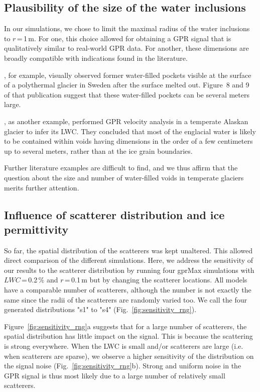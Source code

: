 \subsection{Plausibility of the size of the water inclusions}

In our simulations, we chose to limit the maximal radius of the water inclusions to $r$\,=\,1\,m. For one, this choice allowed for obtaining a GPR signal that is qualitatively similar to real-world GPR data. For another, these dimensions are broadly compatible with indications found in the literature.

\cite{Holmlund1988}, for example, visually observed former water-filled pockets visible at the surface of a polythermal glacier in Sweden after the surface melted out. Figure~8 and 9 of that publication suggest that these water-filled pockets can be several meters large.

\cite{Bradford&al2009}, as another example, performed GPR velocity analysis in a temperate Alaskan glacier to infer its LWC. They concluded that most of the englacial water is likely to be contained within voids having dimensions in the order of a few centimeters up to several meters, rather than at the ice grain boundaries. 

Further literature examples are difficult to find, and we thus affirm that the question about the size and number of water-filled voids in temperate glaciers merits further attention. 



\subsection{Influence of scatterer distribution and ice permittivity}

So far, the spatial distribution of the scatterers was kept unaltered. This allowed direct comparison of the different simulations. Here, we address the sensitivity of our results to the scatterer distribution by running four gprMax simulations with $LWC$\,=\,0.2\,\% and $r$\,=\,0.1\,m but by changing the scatterer locations. All models have a comparable number of scatterers, although the number is not exactly the same since the radii of the scatterers are randomly varied too. We call the four generated distributions "s1" to "s4" (Fig.~\ref{fig:sensitivity_rng}). 

Figure~\ref{fig:sensitivity_rng}a suggests that for a large number of scatterers, the spatial distribution has little impact on the signal. This is because the scattering is strong everywhere. When the LWC is small and/or scatterers are large (i.e. when scatterers are sparse), we observe a higher sensitivity of the distribution on the signal noise (Fig.~\ref{fig:sensitivity_rng}b). Strong and uniform noise in the GPR signal is thus most likely due to a large number of relatively small scatterers. 

